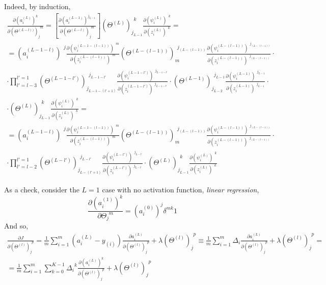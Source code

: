 \documentclass[10pt]{amsart}
\begin{document}
\begin{multicols*}{2}
Indeed, by induction, 
\[
\begin{gathered}
\frac{\partial (a_i^{(L)})^k }{ \partial (\Theta^{(L-l))})_j^{\  \  m} } =  \left[  \frac{\partial (a_i^{(L-1)})^{j_{L-1} }}{ \partial (\Theta^{(L-l)})_j^{\  \  m} } \right]  (\Theta^{(L)})_{ j_{L-1}}^{\  \  k}      \frac{ \partial (\psi^{(L)}_i)^{\  \  k } }{ \partial (z^{(L)}_i)^{\  \  k} } = \\
= (a^{(L-1-l)}_i)^{\  \  j}    \frac{ \partial (\psi_i^{(L-1-(l-1))})^{\  \  m } }{ \partial (z_i^{(L-(l-1))})^{\  \   m } }  (\Theta^{(L-(l-1))})_m^{\  \  j_{(L-(l-1))}}      \frac{ \partial (\psi_i^{(L-(l-1))})^{\  \  j_{(L-(l-1))} } }{ \partial (z_i^{(L-(l-1))})^{\  \  j_{(L-(l-1))}} } \cdot \\
\cdot \prod_{l' = l-3}^{l'=1} (\Theta^{(L-1-l')})_{ j_{L-1-(l'+1)}}^{\  \  j_{L-1-l'}}      \frac{ \partial (\psi^{(L-1-l')}_i)^{\  \  j_{L-1-l'} } }{ \partial (z^{(L-1-l')}_i)^{\  \  j_{L-1-l'}} } \cdot (\Theta^{(L-1)})_{ j_{L-2}}^{\  \  j_{L-1}}      \frac{ \partial (\psi_i^{(L-1)})^{\  \  j_{L-1} } }{ \partial (z_i^{(L-1)})^{\  \  j_{L-1}} } \cdot \\ 
\cdot (\Theta^{(L)})_{ j_{L-1}}^{\  \  k}      \frac{ \partial (\psi^{(L)}_i)^{\  \  k } }{ \partial (z^{(L)}_i)^{\  \  k} } = \\
= (a^{(L-1-l)}_i)^{\  \  j}    \frac{ \partial (\psi_i^{(L-1-(l-1))})^{\  \  m } }{ \partial (z_i^{(L-(l-1))})^{\  \   m } }  (\Theta^{(L-(l-1))})_m^{\  \  j_{(L-(l-1))}}      \frac{ \partial (\psi_i^{(L-(l-1))})^{\  \  j_{(L-(l-1))} } }{ \partial (z_i^{(L-(l-1))})^{\  \  j_{(L-(l-1))}} } \cdot \\
\cdot \prod_{l' = l-2}^{l'=1} (\Theta^{(L-l')})_{ j_{L-(l'+1)}}^{\  \  j_{L-l'}}      \frac{ \partial (\psi^{(L-l')}_i)^{\  \  j_{L-l'} } }{ \partial (z^{(L-l')}_i)^{\  \  j_{L-l'}} } \cdot (\Theta^{(L)})_{ j_{L-1}}^{\  \  k}      \frac{ \partial (\psi^{(L)}_i)^{\  \  k } }{ \partial (z^{(L)}_i)^{\  \  k} } 
\end{gathered}
\]


As a check, consider the $L=1$ case with no activation function, \emph{linear regression}, 
\[
\frac{ \partial (a_i^{(1)})^k }{ \partial \Theta_j^{\  \  m}} = (a^{(0)}_i)^j \delta^{mk} 1
\]
And so,
\[
\begin{gathered}
\frac{\partial J}{ \partial ( \Theta^{(l)})_j^{\  \  p} } = \frac{1}{m} \sum_{i=1}^m (a_i^{(L)} - y_{(i)} ) \frac{\partial a_i^{(L)} }{ \partial ( \Theta^{(l)})_j^{\  \  p} } + \lambda ( \Theta^{(l)})_j^{\  \  p} \equiv \frac{1}{m} \sum_{i=1}^m \Delta _i \frac{\partial a_i^{(L)} }{ \partial  ( \Theta^{(l)})_j^{\  \  p} } + \lambda ( \Theta^{(l)})_j^{\  \  p} =\\
= \frac{1}{m} \sum_{i=1}^m \sum_{k=0}^{K-1} \Delta_i^{\  \  k} \frac{ \partial ( a_i^{(L)})^k }{ \partial ( \Theta^{(l)})_j^{\  \  p}} + \lambda ( \Theta^{(l)})_j^{\  \  p} 
\end{gathered}
\]


\end{multicols*}
\end{document}
